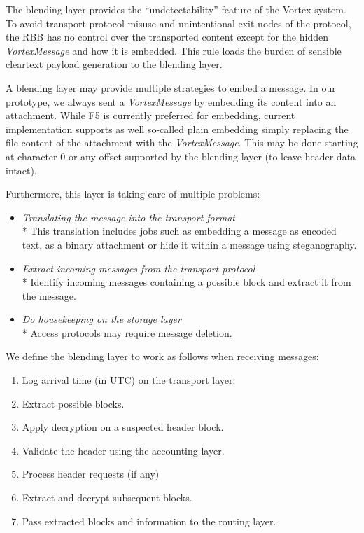 \documentclass[acmsmall, screen, review]{acmart}
\begin{document}
	The blending layer provides the ``undetectability'' feature of the Vortex system. To avoid transport protocol misuse and unintentional exit nodes of the protocol, the RBB has no control over the transported content except for the hidden \emph{VortexMessage} and how it is embedded. This rule loads the burden of sensible cleartext payload generation to the blending layer. 
	
	A blending layer may provide multiple strategies to embed a message. In our prototype, we always sent a \emph{VortexMessage} by embedding its content into an attachment. While F5\cite{f5} is currently preferred for embedding, current implementation supports as well so-called plain embedding simply replacing the file content of the attachment with the \emph{VortexMessage}. This may be done starting at character 0 or any offset supported by the blending layer (to leave header data intact).
	
	Furthermore, this layer is taking care of multiple problems:
	\begin{itemize}
		\item \emph{Translating the message into the transport format}\\*
		This translation includes jobs such as embedding a message as encoded text, as a binary attachment or hide it within a message using steganography.
		\item \emph{Extract incoming messages from the transport protocol}\\*
		Identify incoming messages containing a possible block and extract it from the message.
		\item \emph{Do housekeeping on the storage layer}\\*
		Access protocols may require message deletion.
	\end{itemize}
	
	We define the blending layer to work as follows when receiving messages:
	\begin{enumerate}
		\item Log arrival time (in UTC) on the transport layer.
		\item Extract possible blocks.
		\item Apply decryption on a suspected header block.
		\item Validate the header using the accounting layer.
		\item Process header requests (if any)
		\item Extract and decrypt subsequent blocks.
		\item Pass extracted blocks and information to the routing layer.
	\end{enumerate}
	
\end{document}
